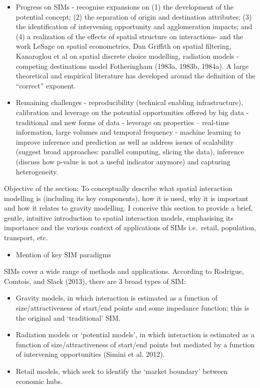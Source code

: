 \documentclass[11pt,letterpaper]{article}
\providecommand{\tightlist}{%
  \setlength{\itemsep}{0pt}\setlength{\parskip}{0pt}}
\begin{document}
\begin{itemize}
\item
  Progress on SIMs - recognise expansions on (1) the development of the potential concept; (2) the separation of origin and destination attributes; (3) the identification of intervening opportunity and agglomeration impacts; and (4) a realization of the effects of spatial structure on interactions- and the work LeSage on spatial econometrics, Dan Griffith on spatial filtering, Kanaroglou et al on spatial discrete choice modelling, radiation models - competing destinations model Fotheringham (1983a, 1983b, 1984a).
  A large theoretical and empirical literature has developed around the definition of the ``correct'' exponent.
\item
  Remaining challenges - reproducibility (technical enabling infrastructure), calibration and leverage on the potential opportunities offered by big data - traditional and new forms of data - leverage on properties -- real-time information, large volumes and temporal frequency - machine learning to improve inference and prediction as well as address issues of scalability (suggest broad approaches: parallel computing, slicing the data), inference (discuss how p-value is not a useful indicator anymore) and capturing heterogeneity.
\end{itemize}

Objective of the section: To conceptually describe what spatial interaction modelling is (including its key components), how it is used, why it is important and how it relates to gravity modelling.
I conceive this section to provide a brief, gentle, intuitive introduction to spatial interaction models, emphasising its importance and the various context of applications of SIMs i.e.~retail, population, transport, etc.

\begin{itemize}
\tightlist
\item
  Mention of key SIM paradigms
\end{itemize}

SIMs cover a wide range of methods and applications.
According to Rodrigue, Comtois, and Slack (2013), there are 3 broad types of SIM:

\begin{itemize}
\item
  Gravity models, in which interaction is estimated as a function of size/attractiveness of start/end points and some impedance function; this is the original and `traditional' SIM.
\item
  Radiation models or `potential models', in which interaction is estimated as a function of size/attractiveness of start/end points but mediated by a function of intervening opportunities (Simini et al. 2012).
\item
  Retail models, which seek to identify the `market boundary' between economic hubs.
\end{itemize}
\end{document}
